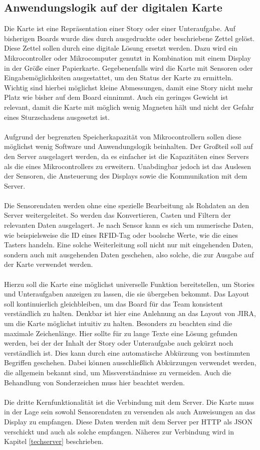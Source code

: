 \documentclass[12pt,titlepage]{scrartcl}
\begin{document}
		\subsection{Anwendungslogik auf der digitalen Karte} \label{defKarte}
		Die Karte ist eine Repräsentation einer Story oder einer Unteraufgabe. Auf bisherigen Boards wurde dies durch ausgedruckte oder beschriebene Zettel gelöst. Diese Zettel sollen durch eine digitale Lösung ersetzt werden. Dazu wird ein Mikrocontroller oder Mikrocomputer genutzt in Kombination mit einem Display in der Größe einer Papierkarte. Gegebenenfalls wird die Karte mit Sensoren oder Eingabemöglichkeiten ausgestattet, um den Status der Karte zu ermitteln. Wichtig sind hierbei möglichst kleine Abmessungen, damit eine Story nicht mehr Platz wie bisher auf dem Board einnimmt. Auch ein geringes Gewicht ist relevant, damit die Karte mit möglich wenig Magneten hält und nicht der Gefahr eines Sturzschadens ausgesetzt ist. \\ \\
		Aufgrund der begrenzten Speicherkapazität von Mikrocontrollern sollen diese möglichst wenig Software und Anwendungslogik beinhalten. Der Großteil soll auf den Server ausgelagert werden, da es einfacher ist die Kapazitäten eines Servers als die eines Mikrocontrollers zu erweitern. Unabdingbar jedoch ist das Auslesen der Sensoren, die Ansteuerung des Displays sowie die Kommunikation mit dem Server. \\ \\
Die Sensorendaten werden ohne eine spezielle Bearbeitung als Rohdaten an den Server weitergeleitet. So werden das Konvertieren, Casten und Filtern der relevanten Daten ausgelagert. Je nach Sensor kann es sich um numerische Daten, wie beispielsweise die ID eines RFID-Tag oder boolsche Werte, wie die eines Tasters handeln. Eine solche Weiterleitung soll nicht nur mit eingehenden Daten, sondern auch mit ausgehenden Daten geschehen, also solche, die zur Ausgabe auf der Karte verwendet werden. \\ \\
Hierzu soll die Karte eine möglichst universelle Funktion bereitstellen, um Stories und Unteraufgaben anzeigen zu lassen, die sie übergeben bekommt. Das Layout soll kontinuierlich gleichbleiben, um das Board für das Team konsistent verständlich zu halten. Denkbar ist hier eine Anlehnung an das Layout von JIRA, um die Karte möglichst intuitiv zu halten. Besonders zu beachten sind die maximale Zeichenlänge. Hier sollte für zu lange Texte eine Lösung gefunden werden, bei der der Inhalt der Story oder Unteraufgabe auch gekürzt noch verständlich ist. Dies kann durch eine automatische Abkürzung von bestimmten Begriffen geschehen. Dabei können ausschließlich Abkürzungen verwendet werden, die allgemein bekannt sind, um Missverständnisse zu vermeiden. Auch die Behandlung von Sonderzeichen muss hier beachtet werden. \\ \\
Die dritte Kernfunktionalität ist die Verbindung mit dem Server. Die Karte muss in der Lage sein sowohl Sensorendaten zu versenden als auch Anweisungen an das Display zu empfangen. Diese Daten werden mit dem Server per HTTP als JSON verschickt und auch als solche empfangen. Näheres zur Verbindung wird in Kapitel \ref{techserver} beschrieben.  
\end{document}
